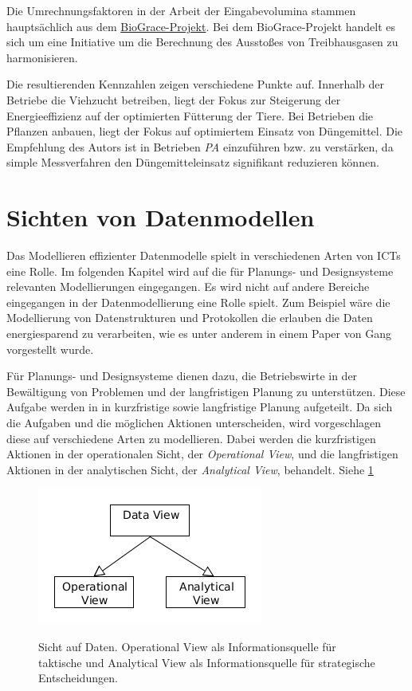 Die Umrechnungsfaktoren in der Arbeit der Eingabevolumina stammen hauptsächlich aus dem \href{http://www.biograce.net/}{BioGrace-Projekt}.\cite{jour:Meyer-Aurich2013} Bei dem BioGrace-Projekt handelt es sich um eine Initiative um die Berechnung des Ausstoßes von Treibhausgasen zu harmonisieren.

Die resultierenden Kennzahlen zeigen verschiedene Punkte auf. Innerhalb der Betriebe die Viehzucht betreiben, liegt der Fokus zur Steigerung der Energieeffizienz auf der optimierten Fütterung der Tiere. Bei Betrieben die Pflanzen anbauen, liegt der Fokus auf optimiertem Einsatz von Düngemittel. Die Empfehlung des Autors ist in Betrieben \textit{PA} einzuführen bzw. zu verstärken, da simple Messverfahren den Düngemitteleinsatz signifikant reduzieren können.\cite{jour:Meyer-Aurich2013}

\section{Sichten von Datenmodellen}
Das Modellieren effizienter Datenmodelle spielt in verschiedenen Arten von ICTs eine Rolle. Im folgenden Kapitel wird auf die für Planungs- und Designsysteme relevanten Modellierungen eingegangen. Es wird nicht auf andere Bereiche eingegangen in der Datenmodellierung eine Rolle spielt. Zum Beispiel wäre die Modellierung von Datenstrukturen und Protokollen die erlauben die Daten energiesparend zu verarbeiten, wie es unter anderem in einem Paper von Gang\cite{jour:Lu2007} vorgestellt wurde.

Für Planungs- und Designsysteme dienen dazu, die Betriebswirte in der Bewältigung von Problemen und der langfristigen Planung zu unterstützen. Diese Aufgabe werden in \cite{jour:Schulze2007} in kurzfristige sowie langfristige Planung aufgeteilt. Da sich die Aufgaben und die möglichen Aktionen unterscheiden, wird vorgeschlagen diese auf verschiedene Arten zu modellieren. Dabei werden die kurzfristigen Aktionen in der operationalen Sicht, der \textit{Operational View}, und die langfristigen Aktionen in der analytischen Sicht, der \textit{Analytical View}, behandelt. Siehe \ref{fig:dataviews}

\begin{figure}[h]
 \includegraphics[natwidth=\textwidth]{figures/datamodelling/dataviews.png}
 \centering
 \label{fig:dataviews}
 \caption{Sicht auf Daten. Operational View als Informationsquelle für taktische und Analytical View als Informationsquelle für strategische Entscheidungen.}
\end{figure}

